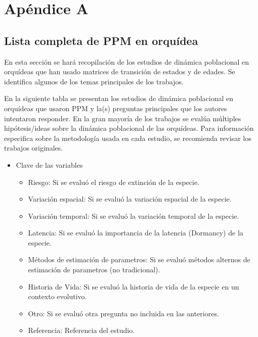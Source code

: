 \documentclass[
  12pt,
  letterpaper,
]{book}
\author{}
\date{}
\providecommand{\tightlist}{%
  \setlength{\itemsep}{0pt}\setlength{\parskip}{0pt}}\usepackage{longtable,booktabs,array}
\renewcommand*\contentsname{Table of contents}
\newcommand\contentsname{Table of contents}
\begin{document}
\frontmatter

\renewcommand*\contentsname{Table of contents}
{
\hypersetup{linkcolor=}
\setcounter{tocdepth}{2}
\tableofcontents
}

\mainmatter
\chapter*{Apéndice A}\label{AppendixA}

\section*{Lista completa de PPM en
orquídea}\label{lista-completa-de-ppm-en-orquuxeddea}

En esta sección se hará recopilación de los estudios de dinámica
poblacional en orquídeas que han usado matrices de transición de estados
y de edades. Se identifica algunos de los temas principales de los
trabajos.

En la siguiente tabla se presentan los estudios de dinámica poblacional
en orquídeas que usaron PPM y la(s) preguntas principales que los
autores intentaron responder. En la gran mayoría de los trabajos se
evalúa múltiples hipótesis/ideas sobre la dinámica poblacional de las
orquídeas. Para información especifica sobre la metodología usada en
cada estudio, se recomienda revisar los trabajos originales.

\begin{itemize}
\item
  Clave de las variables

  \begin{itemize}
  \tightlist
  \item
    Riesgo: Si se evaluó el riesgo de extinción de la especie.
  \item
    Variación espacial: Si se evaluó la variación espacial de la
    especie.
  \item
    Variación temporal: Si se evaluó la variación temporal de la
    especie.
  \item
    Latencia: Si se evaluó la importancia de la latencia (Dormancy) de
    la especie.
  \item
    Métodos de estimación de parametros: Si se evaluó métodos alternos
    de estimación de parametros (no tradicional).
  \item
    Historia de Vida: Si se evaluó la historia de vida de la especie en
    un contexto evolutivo.
  \item
    Otro: Si se evaluó otra pregunta no incluida en las anteriores.
  \item
    Referencia: Referencia del estudio.
  \end{itemize}
\end{itemize}
\end{document}
